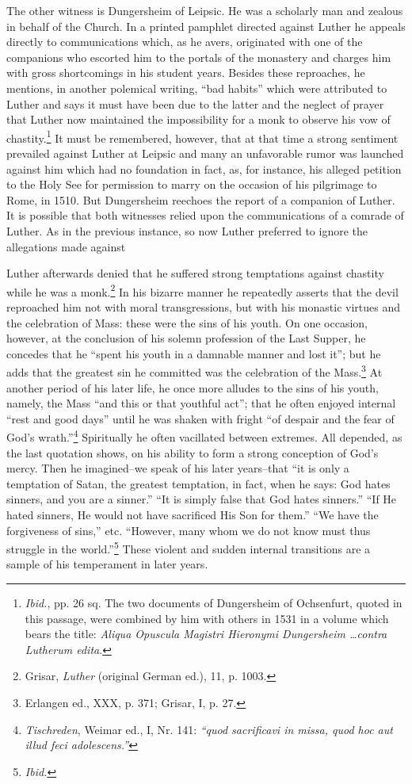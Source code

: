 The other witness is Dungersheim of Leipsic. He was a scholarly
man and zealous in behalf of the Church. In a printed pamphlet
directed against Luther he appeals directly to communications which,
as he avers, originated with one of the companions who escorted
him to the portals of the monastery and charges him with gross shortcomings
in his student years. Besides these reproaches, he mentions,
in another polemical writing, “bad habits” which were attributed
to Luther and says it must have been due to the latter and the neglect
of prayer that Luther now maintained the impossibility for a monk
to observe his vow of chastity.\footnote{\textit{Ibid.}, pp. 26 sq. The two documents of Dungersheim of Ochsenfurt, quoted in this passage, were combined by him with others in 1531 in a volume which bears the title: \textit{Aliqua Opuscula Magistri Hieronymi Dungersheim \dots contra Lutherum edita}.}
It must be remembered, however,
that at that time a strong sentiment prevailed against Luther at
Leipsic and many an unfavorable rumor was launched against him
which had no foundation in fact, as, for instance, his alleged petition
to the Holy See for permission to marry on the occasion of his
pilgrimage to Rome, in 1510. But Dungersheim reechoes the report of
a companion of Luther. It is possible that both witnesses relied upon
the communications of a comrade of Luther. As in the previous instance,
so now Luther preferred to ignore the allegations made against

Luther afterwards denied that he suffered strong temptations
against chastity while he was a monk.\footnote{Grisar, \textit{Luther} (original German ed.), 11, p. 1003.}
In his bizarre manner he
repeatedly asserts that the devil reproached him not with moral
transgressions, but with his monastic virtues and the celebration of
Mass: these were the sins of his youth. On one occasion, however,
at the conclusion of his solemn profession of the Last Supper, he
concedes that he “spent his youth in a damnable manner and lost
it”; but he adds that the greatest sin he committed was the celebration
of the Mass.\footnote{Erlangen ed., XXX, p. 371; Grisar, I, p. 27.}
At another period of his later life, he once
more alludes to the sins of his youth, namely, the Mass “and this
or that youthful act”; that he often enjoyed internal “rest and good
days” until he was shaken with fright “of despair and the fear of
God’s wrath.”\footnote{\textit{Tischreden}, Weimar ed., I, Nr. 141: \textit{``quod sacrificavi in missa, quod hoc aut illud feci adolescens.''}}
Spiritually he often vacillated between extremes.
All depended, as the last quotation shows, on his ability to form
a strong conception of God’s mercy. Then he imagined--we speak of
his later years--that “it is only a temptation of Satan, the greatest
temptation, in fact, when he says: God hates sinners, and you are
a sinner.” “It is simply false that God hates sinners.” “If He hated
sinners, He would not have sacrificed His Son for them.” “We have
the forgiveness of sins,” etc. “However, many whom we do not
know must thus struggle in the world.”\footnote{\textit{Ibid.}}
These violent and sudden internal transitions are a sample of his temperament in later years.


